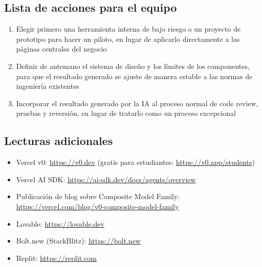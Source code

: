 \subsection{Lista de acciones para el equipo}

\begin{enumerate}
    \item Elegir primero una herramienta interna de bajo riesgo o un proyecto de prototipo para hacer un piloto, en lugar de aplicarlo directamente a las páginas centrales del negocio
    \item Definir de antemano el sistema de diseño y los límites de los componentes, para que el resultado generado se ajuste de manera estable a las normas de ingeniería existentes
    \item Incorporar el resultado generado por la IA al proceso normal de code review, pruebas y reversión, en lugar de tratarlo como un proceso excepcional
\end{enumerate}

\subsection{Lecturas adicionales}

\begin{itemize}
    \item Vercel v0: \url{https://v0.dev} (gratis para estudiantes: \url{https://v0.app/students})
    \item Vercel AI SDK: \url{https://ai-sdk.dev/docs/agents/overview}
    \item Publicación de blog sobre Composite Model Family: \url{https://vercel.com/blog/v0-composite-model-family}
    \item Lovable: \url{https://lovable.dev}
    \item Bolt.new (StackBlitz): \url{https://bolt.new}
    \item Replit: \url{https://replit.com}
\end{itemize}




